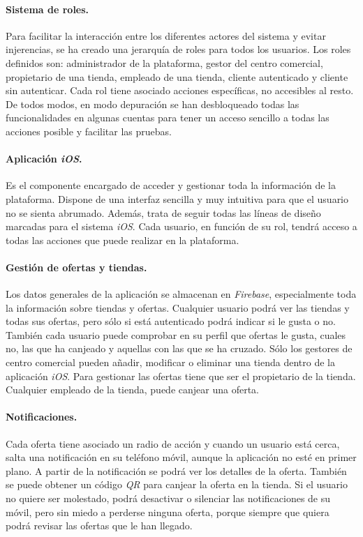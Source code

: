 \paragraph{Sistema de roles.} Para facilitar la interacción entre los diferentes actores del sistema y evitar injerencias, se ha creado una jerarquía de roles para todos los usuarios.
Los roles definidos son: administrador de la plataforma, gestor del centro comercial, propietario de una tienda, empleado de una tienda, cliente autenticado y cliente sin autenticar. 
Cada rol tiene asociado acciones específicas, no accesibles al resto.
De todos modos, en modo depuración se han desbloqueado todas las funcionalidades en algunas cuentas para tener un acceso sencillo a todas las acciones posible y facilitar las pruebas.

\paragraph{Aplicación \emph{iOS}.} Es el componente encargado de acceder y gestionar toda la información de la plataforma.
Dispone de una interfaz  sencilla y muy intuitiva para que el usuario no se sienta abrumado. Además, trata de seguir todas las líneas de diseño marcadas para el sistema \textit{iOS}.
Cada usuario, en función de su rol, tendrá acceso a todas las acciones que puede realizar en la plataforma.

\paragraph{Gestión de ofertas y tiendas.} Los datos generales de la aplicación se almacenan en \textit{Firebase}, especialmente toda la información sobre tiendas y ofertas. 
Cualquier usuario podrá ver las tiendas y todas sus ofertas, pero sólo si está autenticado podrá indicar si le gusta o no.
También cada usuario puede comprobar en su perfil que ofertas le gusta, cuales no, las que ha canjeado y aquellas con las que se ha cruzado.
Sólo los gestores de centro comercial pueden añadir, modificar o eliminar una tienda dentro de la aplicación \emph{iOS}.
Para gestionar las ofertas tiene que ser el propietario de la tienda. 
Cualquier empleado de la tienda, puede canjear una oferta.

\paragraph{Notificaciones.} Cada oferta tiene asociado un radio de acción y cuando un usuario está cerca, salta una notificación en su teléfono móvil, aunque la aplicación no esté en primer plano. 
A partir de la notificación se podrá ver los detalles de la oferta.
También se puede obtener un código \textit{QR} para canjear la oferta en la tienda. 
Si el usuario no quiere ser molestado, podrá desactivar o silenciar las notificaciones de su móvil, pero sin miedo a perderse ninguna oferta, porque siempre que quiera podrá revisar las ofertas que le han llegado.

